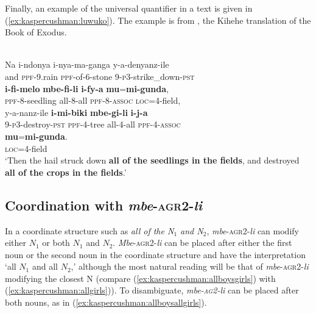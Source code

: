 \documentclass[output=paper,modfonts,nonflat]{langsci/langscibook}
\begin{document}
Finally, an example of the universal quantifier in a text is given in (\ref{ex:kaspercushman:luwuko}). The example is from \citet[9:25]{Luwuko2011}, the Kihehe translation of the Book of Exodus.

\begin{exe} 

\ex {}\label{ex:kaspercushman:luwuko}\\
\gll Na i-ndonya i-nya-ma-ganga y-a-denyanz-ile \\ 
and \textsc{ppf}-9.rain \textsc{ppf}-of-6-stone 9-\textsc{p3}-strike\_down-\textsc{pst}\\


\gll \textbf{i-fi-melo} \textbf{mbe-fi-li} \textbf{i-fy-a} \textbf{mu}=\textbf{mi-gunda}, \\
\textsc{ppf}-8-seedling all-8-all \textsc{ppf}-8-\textsc{assoc} \textsc{loc}=4-field,\\


\gll y-a-nanz-ile \textbf{i-mi-biki} \textbf{mbe-gi-li} \textbf{i-j-a}  \\
9-\textsc{p3}-destroy-\textsc{pst} \textsc{ppf}-4-tree all-4-all \textsc{ppf}-4-\textsc{assoc}  \\


\gll \textbf{mu}=\textbf{mi-gunda}. \\ 
\textsc{loc}=4-field \\

\glt `Then the hail struck down \textbf{all of the seedlings in the fields}, and destroyed \textbf{all of the crops in the fields}.' \\
\end{exe}

\subsection{Coordination with \emph{mbe}-\textsc{agr2}-\emph{li}}

In a coordinate structure such as \textit{all of the N$_{1}$ and N$_{2}$}, \emph{mbe}-\textsc{agr2}-\emph{li}  can modify either $N_{1}$ or both $N_{1}$ and $N_{2}$.  \emph{Mbe}-\textsc{agr2}-\emph{li} can be placed after either the first noun or the second noun in the coordinate structure and have the interpretation `all $N_{1}$ and all $N_{2}$,' although the most natural reading will be that of \emph{mbe}-\textsc{agr2}-\emph{li} modifying the closest N (compare (\ref{ex:kaspercushman:allboysgirls}) with (\ref{ex:kaspercushman:allgirls})). To disambiguate, \emph{mbe-\textsc{ag2}-li} can be placed after both nouns, as in (\ref{ex:kaspercushman:allboysallgirls}).
\end{document}
